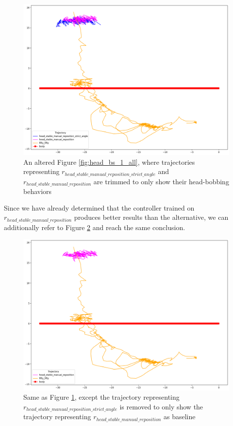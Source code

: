   \begin{figure}[H]
      \centering
      \includegraphics[width=1\textwidth]{figures/head_tracking_results/pigeon_bs_1_all_trimmed_250_550_300_550.png}
      \caption{An altered Figure \ref{fig:head_bs_1_all}, where trajectories representing $r_{head\_stable\_manual\_reposition\_strict\_angle}$ and $r_{head\_stable\_manual\_reposition}$ are trimmed to only show their head-bobbing behaviors}
      \label{fig:head_bs_1_all_trimmed}
  \end{figure}

  Since we have already determined that the controller trained on $r_{head\_stable\_manual\_reposition}$ produces better results than the alternative, we can additionally refer to Figure \ref{fig:head_bs_1_closest_trimmed} and reach the same conclusion.

  \begin{figure}[H]
      \centering
      \includegraphics[width=1\textwidth]{figures/head_tracking_results/pigeon_bs_1_vs_closest_trimmed_300_550.png}
      \caption{Same as Figure \ref{fig:head_bs_1_all_trimmed}, except the trajectory representing $r_{head\_stable\_manual\_reposition\_strict\_angle}$ is removed to only show the trajectory representing $r_{head\_stable\_manual\_reposition}$ as baseline}
      \label{fig:head_bs_1_closest_trimmed}
  \end{figure}
